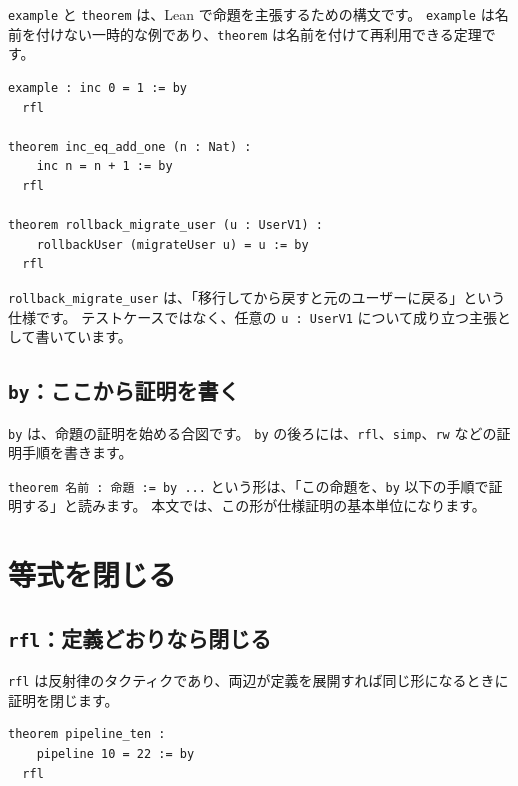 \texttt{example} と \texttt{theorem} は、Lean で命題を主張するための構文です。
\texttt{example} は名前を付けない一時的な例であり、\texttt{theorem} は名前を付けて再利用できる定理です。

\begin{listing}[htbp]
\begin{verbatim}
example : inc 0 = 1 := by
  rfl

theorem inc_eq_add_one (n : Nat) :
    inc n = n + 1 := by
  rfl

theorem rollback_migrate_user (u : UserV1) :
    rollbackUser (migrateUser u) = u := by
  rfl
\end{verbatim}
\caption{\texttt{inc\_eq\_add\_one}・\texttt{rollback\_migrate\_user}}
\label{lst:appA_example_theorem}
\end{listing}

\texttt{rollback\_migrate\_user} は、「移行してから戻すと元のユーザーに戻る」という仕様です。
テストケースではなく、任意の \texttt{u : UserV1} について成り立つ主張として書いています。

\subsection{\texttt{by}：ここから証明を書く}

\texttt{by} は、命題の証明を始める合図です。
\texttt{by} の後ろには、\texttt{rfl}、\texttt{simp}、\texttt{rw} などの証明手順を書きます。

\texttt{theorem 名前 : 命題 := by ...} という形は、「この命題を、\texttt{by} 以下の手順で証明する」と読みます。
本文では、この形が仕様証明の基本単位になります。

\section{等式を閉じる}

\subsection{\texttt{rfl}：定義どおりなら閉じる}

\texttt{rfl} は反射律のタクティクであり、両辺が定義を展開すれば同じ形になるときに証明を閉じます。

\begin{listing}[htbp]
\begin{verbatim}
theorem pipeline_ten :
    pipeline 10 = 22 := by
  rfl
\end{verbatim}
\caption{\texttt{pipeline\_ten}}
\label{lst:appA_rfl}
\end{listing}

